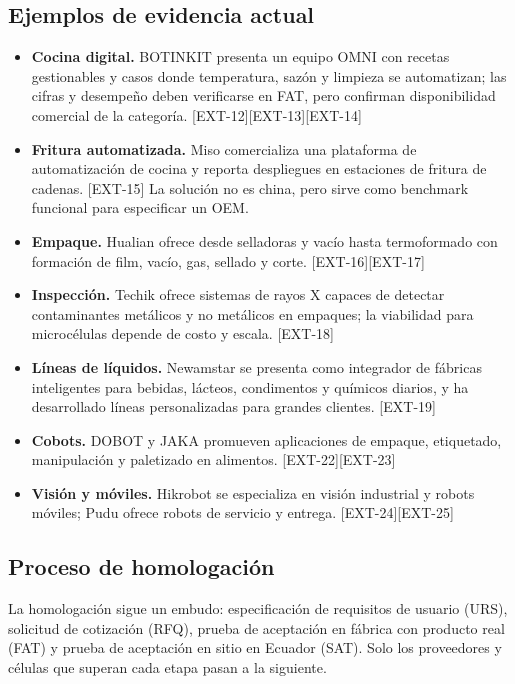 \documentclass[11pt,a4paper]{article}
\begin{document}
\subsection{Ejemplos de evidencia actual}
\begin{itemize}
\item \textbf{Cocina digital.} BOTINKIT presenta un equipo OMNI con recetas gestionables y casos donde
temperatura, sazón y limpieza se automatizan; las cifras y desempeño deben verificarse en FAT, pero
confirman disponibilidad comercial de la categoría. [EXT-12][EXT-13][EXT-14]
\item \textbf{Fritura automatizada.} Miso comercializa una plataforma de automatización de cocina y
reporta despliegues en estaciones de fritura de cadenas. [EXT-15] La solución no es china, pero sirve
como benchmark funcional para especificar un OEM.
\item \textbf{Empaque.} Hualian ofrece desde selladoras y vacío hasta termoformado con formación de film,
vacío, gas, sellado y corte. [EXT-16][EXT-17]
\item \textbf{Inspección.} Techik ofrece sistemas de rayos X capaces de detectar contaminantes metálicos y
no metálicos en empaques; la viabilidad para microcélulas depende de costo y escala. [EXT-18]
\item \textbf{Líneas de líquidos.} Newamstar se presenta como integrador de fábricas inteligentes para
bebidas, lácteos, condimentos y químicos diarios, y ha desarrollado líneas personalizadas para grandes
clientes. [EXT-19]
\item \textbf{Cobots.} DOBOT y JAKA promueven aplicaciones de empaque, etiquetado, manipulación y
paletizado en alimentos. [EXT-22][EXT-23]
\item \textbf{Visión y móviles.} Hikrobot se especializa en visión industrial y robots móviles; Pudu
ofrece robots de servicio y entrega. [EXT-24][EXT-25]
\end{itemize}

\subsection{Proceso de homologación}
La homologación sigue un embudo: especificación de requisitos de usuario (URS), solicitud de cotización
(RFQ), prueba de aceptación en fábrica con producto real (FAT) y prueba de aceptación en sitio en Ecuador
(SAT). Solo los proveedores y células que superan cada etapa pasan a la siguiente.
\end{document}

